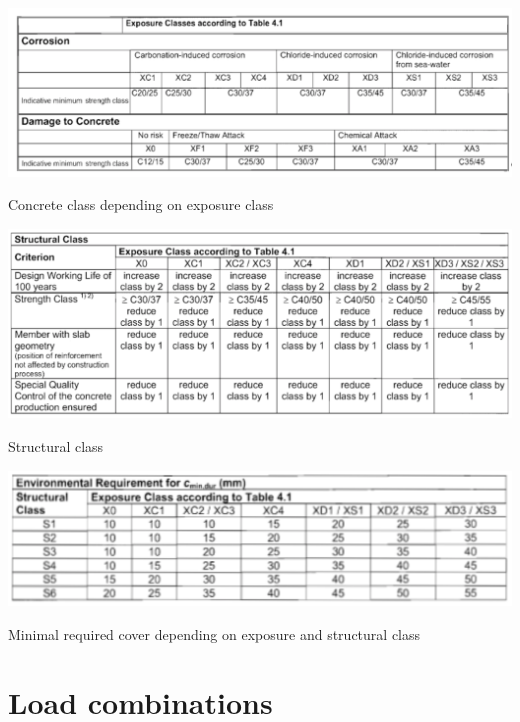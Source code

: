 \documentclass[landscape]{article}
\begin{document}
\begin{multicols*}{2}
\begin{table}[H]
    \centering
    \includegraphics[width=0.95\linewidth]{img/min_class.png}
    \caption{Concrete class depending on exposure class}
    \label{tab:concrete_class}
\end{table}

\begin{table}[H]
    \centering
    \includegraphics[width=0.95\linewidth]{img/4_3.png}
    \caption{Structural class}
    \label{tab:struct_class}
\end{table}
\begin{table}[H]
    \centering
    \includegraphics[width=0.95\linewidth]{img/4_4.png}
    \caption{Minimal required cover depending on exposure and structural class}
    \label{tab:min_cover}
\end{table}


\section{Load combinations} %
\label{sec:load_combinations}

\end{multicols*}
\end{document}
